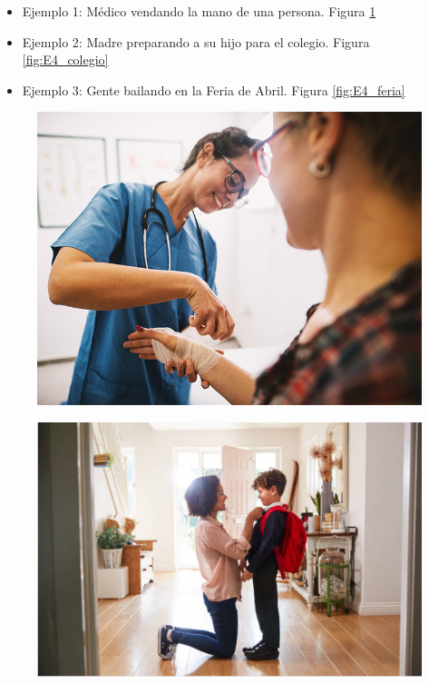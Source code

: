 \begin{itemize}
    \item {Ejemplo 1: Médico vendando la mano de una persona. Figura \ref{fig:E4_medico}}
    \item {Ejemplo 2: Madre preparando a su hijo para el colegio. Figura \ref{fig:E4_colegio}}
    \item {Ejemplo 3: Gente bailando en la Feria de Abril. Figura \ref{fig:E4_feria}}
\end{itemize}



\begin{figure}[H]
\centering
\begin{minipage}{.3\textwidth}
  \centering
  \includegraphics[width=.9\linewidth]{04.Desarrollo/04.Entrega4/01.Iteracion4_1/00.Figuras/04.medico.jpg}
  \label{fig:E4_medico}
\end{minipage}%
\begin{minipage}{.3\textwidth}
  \centering
  \includegraphics[width=.9\linewidth]{04.Desarrollo/04.Entrega4/01.Iteracion4_1/00.Figuras/05.colegio.png}

\end{minipage}
\end{figure}
